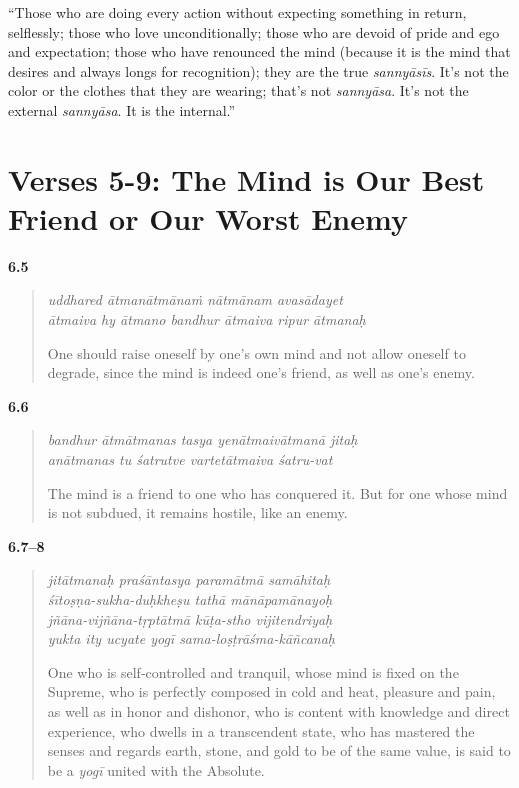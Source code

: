 \enquote{Those who are doing every action without expecting something in return, selflessly; those who love unconditionally; those who are devoid of pride and ego and expectation; those who have renounced the mind (because it is the mind that desires and always longs for recognition); they are the true \textit{sannyāsīs}. It's not the color or the clothes that they are wearing; that’s not \textit{sannyāsa}. It’s not the external \textit{sannyāsa}. It is the internal.}

\section{Verses 5-9: The Mind is Our Best Friend or Our Worst Enemy}\label{sec-verses-5-9-the-mind-is-our-best-friend-or-our-worst-enemy}


\par\noindent\textbf{6.5}\par
\begin{verse}
\textit{uddhared ātmanātmānaṁ nātmānam avasādayet} \\
\textit{ātmaiva hy ātmano bandhur ātmaiva ripur ātmanaḥ}

\noindent One should raise oneself by one’s own mind and not allow oneself to degrade, since the mind is indeed one’s friend, as well as one’s enemy.
\end{verse}
\par



\par\noindent\textbf{6.6}\par
\begin{verse}
\textit{bandhur ātmātmanas tasya yenātmaivātmanā jitaḥ} \\
\textit{anātmanas tu śatrutve vartetātmaiva śatru-vat}

\noindent The mind is a friend to one who has conquered it. But for one whose mind is not subdued, it remains hostile, like an enemy.
\end{verse}
\par



\par\noindent\textbf{6.7–8}\par
\begin{verse}
\textit{jitātmanaḥ praśāntasya paramātmā samāhitaḥ} \\
\textit{śītoṣṇa-sukha-duḥkheṣu tathā mānāpamānayoḥ} \\
\textit{jñāna-vijñāna-tṛptātmā kūṭa-stho vijitendriyaḥ} \\
\textit{yukta ity ucyate yogī sama-loṣṭrāśma-kāñcanaḥ}

\noindent One who is self-controlled and tranquil, whose mind is fixed on the Supreme, who is perfectly composed in cold and heat, pleasure and pain, as well as in honor and dishonor, who is content with knowledge and direct experience, who dwells in a transcendent state, who has mastered the senses and regards earth, stone, and gold to be of the same value, is said to be a \textit{yogī} united with the Absolute.
\end{verse}
\par



